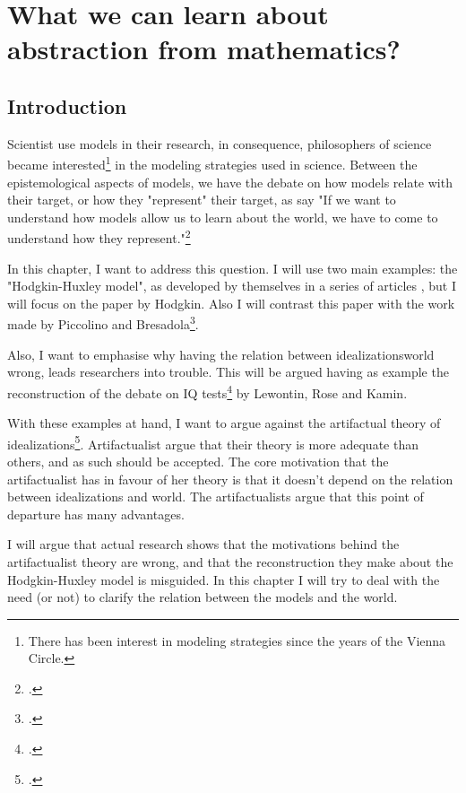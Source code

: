 


\chapter{What we can learn about abstraction from mathematics?}

\section{Introduction}

Scientist use models in their research, in consequence, philosophers of science became interested\footnote{There has been interest in modeling strategies since the years of the Vienna Circle.} in the modeling strategies used in science.
Between the epistemological aspects of models, we have the debate on how models relate with their target, or how they "represent" their target, as \citeauthor{Frigg2020} say "If we want to understand how models allow us to learn about the world, we have to come to understand how they represent."\footcite[][p. x]{Frigg2020}

In this chapter, I want to address this question.
I will use two main examples: the "Hodgkin-Huxley model", as developed by themselves in a series of articles \parencite{Hodgkin1951, Hodgkin1952, Hodgkin1952a, Hodgkin1952b}, but I will focus on the paper  by Hodgkin.
Also I will contrast this paper with the work made by Piccolino and Bresadola\footcite{Piccolino2013}.

Also, I want to emphasise why having the relation between idealizations\/world wrong, leads researchers into trouble.
This will be argued having as example the reconstruction of the debate on IQ tests\footcite{Lewontin2017} by Lewontin, Rose and Kamin.

With these examples at hand, I want to argue against the artifactual theory of idealizations\footcite{Carrillo2021-CARAAP-12, Carrillo2022}.
Artifactualist argue that their theory is more adequate than others, and as such should be accepted.
The core motivation that the artifactualist has in favour of her theory is that it doesn't depend on the relation between idealizations and world.
The artifactualists argue that this point of departure has many advantages.

I will argue that actual research shows that the motivations behind the artifactualist theory are wrong, and that the reconstruction they make about the Hodgkin-Huxley model is misguided.
In this chapter I will try to deal with the need (or not) to clarify the relation between the models and the world.

